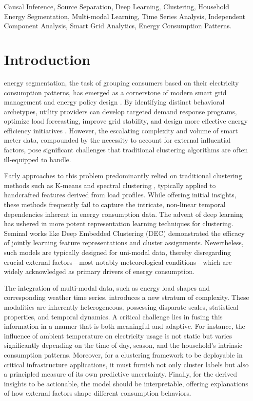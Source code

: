 \documentclass[journal]{IEEEtran}
\begin{document}
\begin{IEEEkeywords}
Causal Inference, Source Separation, Deep Learning, Clustering, Household Energy Segmentation, Multi-modal Learning, Time Series Analysis, Independent Component Analysis, Smart Grid Analytics, Energy Consumption Patterns.
\end{IEEEkeywords}


\section{Introduction}
 energy segmentation, the task of grouping consumers based on their electricity consumption patterns, has emerged as a cornerstone of modern smart grid management and energy policy design \cite{smart_grid_review}. By identifying distinct behavioral archetypes, utility providers can develop targeted demand response programs, optimize load forecasting, improve grid stability, and design more effective energy efficiency initiatives \cite{demand_response_survey}. However, the escalating complexity and volume of smart meter data, compounded by the necessity to account for external influential factors, pose significant challenges that traditional clustering algorithms are often ill-equipped to handle.

Early approaches to this problem predominantly relied on traditional clustering methods such as K-means \cite{kmeans_clustering} and spectral clustering \cite{spectral_clustering}, typically applied to handcrafted features derived from load profiles. While offering initial insights, these methods frequently fail to capture the intricate, non-linear temporal dependencies inherent in energy consumption data. The advent of deep learning has ushered in more potent representation learning techniques for clustering. Seminal works like Deep Embedded Clustering (DEC) \cite{deep_embedding_clustering_xie} demonstrated the efficacy of jointly learning feature representations and cluster assignments. Nevertheless, such models are typically designed for uni-modal data, thereby disregarding crucial external factors—most notably meteorological conditions—which are widely acknowledged as primary drivers of energy consumption.

The integration of multi-modal data, such as energy load shapes and corresponding weather time series, introduces a new stratum of complexity. These modalities are inherently heterogeneous, possessing disparate scales, statistical properties, and temporal dynamics. A critical challenge lies in fusing this information in a manner that is both meaningful and adaptive. For instance, the influence of ambient temperature on electricity usage is not static but varies significantly depending on the time of day, season, and the household's intrinsic consumption patterns. Moreover, for a clustering framework to be deployable in critical infrastructure applications, it must furnish not only cluster labels but also a principled measure of its own predictive uncertainty. Finally, for the derived insights to be actionable, the model should be interpretable, offering explanations of how external factors shape different consumption behaviors.
\end{document}
